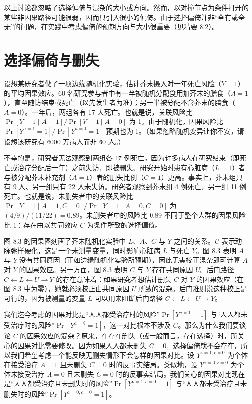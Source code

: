 以上讨论都忽略了选择偏倚与混杂的大小或方向。然而，以对撞节点为条件打开的某些非因果路径可能很弱，因而只引入很小的偏倚。由于选择偏倚并非“全有或全无”的问题，在实践中考虑偏倚的预期方向与大小很重要（见精要 8.2）。

\section{选择偏倚与删失}

设想某研究者做了一项边缘随机化实验，估计芥末摄入对一年死亡风险（$Y=1$）的平均因果效应。60 名研究参与者中有一半被随机分配食用加芥末的膳食（$A=1$），直至随访结束或死亡（以先发生者为准）；另一半被分配不含芥末的膳食（$A=0$）。一年后，两组各有 17 人死亡。也就是说，关联风险比 $\Pr[Y=1\mid A=1]/\Pr[Y=1\mid A=0]$ 为 1。由于随机化，因果风险比 $\Pr[Y^{a=1}=1]/\Pr[Y^{a=0}=1]$ 预期也为 1。（如果忽略随机变异让你不安，请设想该研究有 6000 万病人而非 60 人。）

不幸的是，研究者无法观察到两组各 17 例死亡，因为许多病人在研究结束（即死亡或治疗分配后一年）之前失访，即被删失。研究开始时患有心脏病（$L=1$）者与被分配芥末补充剂（$A=1$）者的删失比例（$C=1$）更高。事实上，芥末组只有 9 人、另一组只有 22 人未失访。研究者观察到芥末组 4 例死亡、另一组 11 例死亡。也就是说，未删失者中的关联风险比 $\Pr[Y=1\mid A=1,C=0]/\Pr[Y=1\mid A=0,C=0]$ 为 $(4/9)/(11/22)=0.89$。未删失者中的风险比 0.89 不同于整个人群的因果风险比 1：存在由以共同效应 $C$ 为条件所致的选择偏倚。

图 8.3 的因果图刻画了芥末随机化实验中 $L$、$A$、$C$ 与 $Y$ 之间的关系。$U$ 表示动脉粥样硬化，这是一个未测量变量，同时影响心脏病 $L$ 与死亡 $Y$。图 8.3 表明 $A$ 与 $Y$ 没有共同原因（正如边缘随机化实验所预期），因此无需校正混杂即可计算 $A$ 对 $Y$ 的因果效应。另一方面，图 8.3 表明 $C$ 与 $Y$ 存在共同原因 $U$。后门路径 $C\leftarrow L\leftarrow U\to Y$ 的存在意味着：如果研究者想估计删失 $C$ 对 $Y$ 的因果效应（在图 8.3 中为零），她就必须校正由共同原因 $U$ 所致的混杂。后门准则说这种校正是可行的，因为被测量的变量 $L$ 可以用来阻断后门路径 $C\leftarrow L\leftarrow U\to Y$。

我们迄今考虑的因果对比是“人人都受治疗时的风险”$\Pr[Y^{a=1}=1]$ 与“人人都未受治疗时的风险”$\Pr[Y^{a=0}=1]$，这一对比根本不涉及 $C$。那么为什么我们要谈论 $C$ 的因果效应的混杂？原来，在存在删失（或一般而言，存在选择）时，所关心的因果对比需要修改。因为如果人人都未删失 $C=0$，选择偏倚就不会存在，所以我们希望考虑一个能反映无删失情形下会怎样的因果对比。设 $Y^{a=1,c=0}$ 为个体在接受治疗 $A=1$ 且未删失 $C=0$ 时的反事实结局。类似地，设 $Y^{a=0,c=0}$ 为个体未接受治疗 $A=0$ 且未删失 $C=0$ 时的反事实结局。我们关心的因果对比现在是“人人都受治疗且未删失时的风险”$\Pr[Y^{a=1,c=0}=1]$ 与“人人都未受治疗且未删失时的风险”$\Pr[Y^{a=0,c=0}=1]$。

